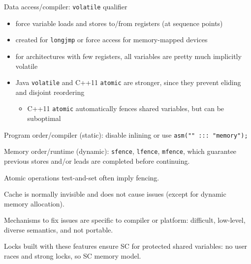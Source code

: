 \documentclass[11pt]{article}
\begin{document}
Data access/compiler: \texttt{volatile} qualifier
\begin{itemize}
\item force variable loads and stores to/from registers (at sequence points)
\item created for \texttt{longjmp} or force access for memory-mapped devices
\item for architectures with few registers, all variables are pretty much implicitly volatile
\item Java \texttt{volatile} and C++11 \texttt{atomic} are stronger, since they prevent eliding and disjoint reordering
\begin{itemize}
\item C++11 \texttt{atomic} automatically fences shared variables, but can be suboptimal
\end{itemize}
\end{itemize}


Program order/compiler (static): disable inlining or use \texttt{asm("" ::: "memory");}

Memory order/runtime (dynamic): \texttt{sfence}, \texttt{lfence}, \texttt{mfence}, which guarantee previous stores
and/or leads are completed before continuing.

Atomic operations test-and-set often imply fencing.

Cache is normally invisible and does not cause issues (except for dynamic memory allocation).

Mechanisms to fix issues are specific to compiler or platform: difficult, low-level, diverse semantics,
and not portable.

Locks built with these features ensure SC for protected shared variables: no user races and strong
locks, so SC memory model.
\end{document}
